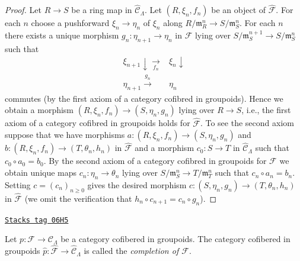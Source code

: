 \begin{proof}
Let $R \to S$ be a ring map in $\widehat{\mathcal{C}}_\Lambda$.
Let $(R, \xi_n, f_n)$ be an object of $\widehat{\mathcal{F}}$.
For each $n$ choose a pushforward $\xi_n \to \eta_n$ of $\xi_n$
along $R/\mathfrak m_R^n \to S/\mathfrak m_S^n$. For each $n$ there
exists a unique morphism $g_n : \eta_{n + 1} \to \eta_n$ in $\mathcal{F}$
lying over $S/\mathfrak m_S^{n + 1} \to S/\mathfrak m_S^n$ such that
$$
\begin{array}{cc}\xi_{n + 1} \downarrow\underset{f_n}{\longrightarrow} & \xi_n \downarrow \\ \eta_{n + 1} \overset{g_n}{\longrightarrow} & \eta_n\end{array}
$$
commutes (by the first axiom of a category cofibred in groupoids).
Hence we obtain a morphism $(R, \xi_n, f_n) \to (S, \eta_n, g_n)$
lying over $R \to S$, i.e., the first axiom of a category cofibred in
groupoids holds for $\widehat{\mathcal{F}}$. To see the second axiom
suppose that we have morphisms
$a : (R, \xi_n, f_n) \to (S, \eta_n, g_n)$ and
$b : (R, \xi_n, f_n) \to (T, \theta_n, h_n)$ in $\widehat{\mathcal{F}}$
and a morphism $c_0 : S \to T$ in $\widehat{\mathcal{C}}_\Lambda$ such that
$c_0 \circ a_0 = b_0$. By the second axiom of a category cofibred in groupoids
for $\mathcal{F}$ we obtain unique maps $c_n : \eta_n \to \theta_n$
lying over $S/\mathfrak m_S^n \to T/\mathfrak m_T^n$ such that
$c_n \circ a_n = b_n$. Setting $c = (c_n)_{n \geq 0}$ gives the desired
morphism $c : (S, \eta_n, g_n) \to (T, \theta_n, h_n)$ in
$\widehat{\mathcal{F}}$ (we omit the verification that
$h_n \circ c_{n + 1} = c_n \circ g_n$).
\end{proof}

\begin{definition}[Completion]
\label{formal-defos-definition-completion}
\href{https://stacks.math.columbia.edu/tag/06H5}{\texttt{Stacks tag 06H5}}

Let $p : \mathcal{F} \to \mathcal{C}_\Lambda$ be a category cofibered in
groupoids. The category cofibered in groupoids
$\widehat{p} : \widehat{\mathcal  F} \to \widehat{\mathcal{C}}_\Lambda$
is called the {\it completion of $\mathcal{F}$}.
\end{definition}

